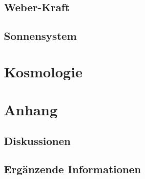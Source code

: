 \documentclass{book}
\numberwithin{equation}{section}
\begin{document}
\chapter{Weber-Kraft}





\chapter{Sonnensystem}



\part{Kosmologie}

\part{Anhang}
\chapter{Diskussionen}

\chapter{Ergänzende Informationen}

\end{document}
